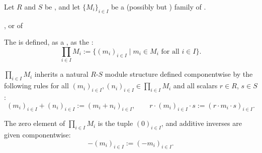 \begin{definition} \label{definition:product_of_modules_of_rings}
    Let $R$ and $S$ be , and let $\{ M_i \}_{i \in I}$ be a (possibly  but ) family of .  

, or of 

    The  is defined, as a , as the :
    $$ \prod_{i \in I} M_i := \{ (m_i)_{i \in I} \mid m_i \in M_i \text{ for all } i \in I \}.  $$

    $\prod_{i \in I} M_i$ inherits a natural $R$-$S$ module structure defined componentwise by the following rules for all $(m_i)_{i \in I}, (n_i)_{i \in I} \in \prod_{i \in I} M_i$ and all scalars $r \in R$, $s \in S$:
    $$ (m_i)_{i \in I} + (n_i)_{i \in I} := (m_i + n_i)_{i \in I}, \qquad r \cdot (m_i)_{i \in I} \cdot s := (r \cdot m_i \cdot s)_{i \in I}.  $$




    The zero element of $\prod_{i \in I} M_i$ is the tuple $(0)_{i \in I}$, and additive inverses are given componentwise:
    $$
    -(m_i)_{i \in I} := (-m_i)_{i \in I}.
    $$


\end{definition}
